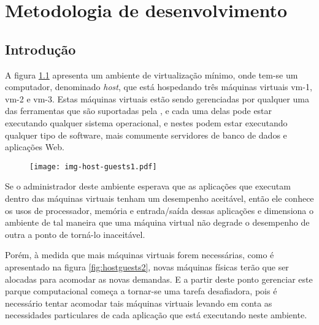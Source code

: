 %
%
%

\chapter{Metodologia de desenvolvimento}\label{sec:meto}

\section{Introdução}

A figura \ref{fig:hostguests1} apresenta um ambiente de virtualização
mínimo, onde tem-se um computador, denominado \emph{host}, que está
hospedando três máquinas virtuais vm-1, vm-2 e
vm-3. Estas máquinas virtuais estão sendo gerenciadas por qualquer
uma das ferramentas que são suportadas pela \libvirt{}, e cada uma delas
pode estar executando qualquer sistema operacional, e nestes podem estar
executando qualquer tipo de software, mais comumente servidores de banco de
dados e aplicações Web.

\begin{figure}[htp]
\centering
\texttt{[image: img-host-guests1.pdf]}
\label{fig:hostguests1}
\end{figure}

Se o administrador deste ambiente esperava que as aplicações que
executam dentro das máquinas virtuais tenham um desempenho aceitável,
então ele conhece os usos de processador, memória e entrada/saída
dessas aplicações e dimensiona o ambiente de tal maneira que uma máquina
virtual não degrade o desempenho de outra a ponto de torná-lo inaceitável.

Porém, à medida que mais máquinas virtuais forem necessárias, como é
apresentado na figura \ref{fig:hostguests2}, novas máquinas físicas terão
que ser alocadas para acomodar as novas demandas. E a partir deste ponto
gerenciar este parque computacional começa a tornar-se uma tarefa
desafiadora, pois é necessário tentar acomodar tais máquinas virtuais
levando em conta as necessidades particulares de cada aplicação que está
executando neste ambiente.

